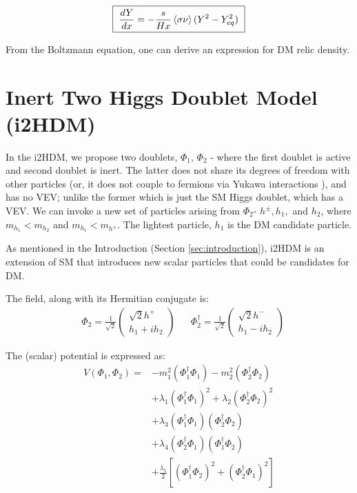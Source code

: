 \documentclass[12pt]{article}
\begin{document}
\begin{equation}
    \boxed{\text{ }\frac{dY}{dx} = -\frac{s}{Hx}\braket{\sigma\nu}(Y^2 - Y^2_{eq})\text{ }}
\end{equation}

From the Boltzmann equation, one can derive an expression for DM relic density.

\section{Inert Two Higgs Doublet Model (i2HDM)}
\label{sec:i2HDM}
In the i2HDM, we propose two doublets, $\Phi_1$, $\Phi_2$ - where the first doublet is active and second doublet is inert. The latter does not share its degrees of freedom with other particles (or, it does not couple to fermions via Yukawa interactions \cite{Belyaev_2022}), and has no VEV; unlike the former which is just the SM Higgs doublet, which has a VEV. We can invoke a new set of particles arising from $\Phi_2$- $h^\pm, h_1,$ and $h_2$, where $m_{h_1} < m_{h_2}$ and $m_{h_1} < m_{h^\pm}$. The lightest particle, $h_1$ is the DM candidate particle.

As mentioned in the Introduction (Section \ref{sec:introduction}), i2HDM is an extension of SM that introduces new scalar particles that could be candidates for DM.

The field, along with its Hermitian conjugate is:
\begin{align}
    &\Phi_2 = \frac{1}{\sqrt{2}}
        \begin{pmatrix}
            {\sqrt{2}h^+} \\
            {h_1 + ih_2 }
        \end{pmatrix}&
    &\Phi_2^\dagger = \frac{1}{\sqrt{2}} 
        \begin{pmatrix}
            {\sqrt{2}h^-} \\
            {h_1 - ih_2 }
        \end{pmatrix}
\end{align} 

The (scalar) potential is expressed as:
\begin{equation}
    \begin{split}
        V(\Phi_1, \Phi_2) =& -m_1^2(\Phi_1^\dagger\Phi_1) - m_2^2(\Phi_2^\dagger\Phi_2)\\ 
        &+ \lambda_1(\Phi_1^\dagger\Phi_1)^2 + \lambda_2(\Phi_2^\dagger\Phi_2)^2 \\
        &+ \lambda_3(\Phi_1^\dagger\Phi_1)(\Phi_2^\dagger\Phi_2) \\
        &+ \lambda_4(\Phi_2^\dagger\Phi_1)(\Phi_1^\dagger\Phi_2)\\ 
        &+ \frac{\lambda_5}{2}[(\Phi_1^\dagger\Phi_2)^2 + (\Phi_2^\dagger\Phi_1)^2]
        \end{split}
        \label{eq:higgs_potential}
\end{equation}
\end{document}
